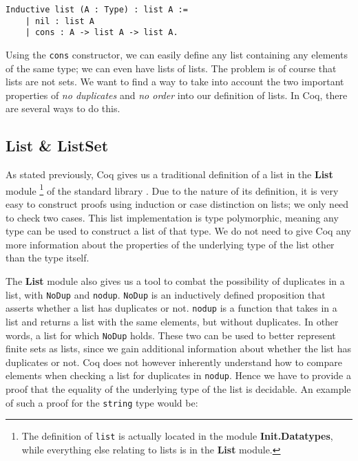 \begin{minipage}{\linewidth}
\begin{lstlisting}[language=Coq, label={lst:list_def}, caption={Inductive definition of list type in Coq}]
Inductive list (A : Type) : list A :=
    | nil : list A
    | cons : A -> list A -> list A.
\end{lstlisting}
\end{minipage}

Using the \lstinline{cons} constructor, we can easily define any list containing any elements of the same type;
we can even have lists of lists.
The problem is of course that lists are not sets. We want to find a way to take into account the two important properties
of \textit{no duplicates} and \textit{no order} into our definition of lists.
In Coq, there are several ways to do this.


\subsection{List \& ListSet}
\label{ssec:list_listset}

As stated previously, Coq gives us a traditional definition of a list in the \textbf{List} module
\footnote{The definition of \lstinline{list} is actually located in the module \textbf{Init.Datatypes}, while everything else relating to lists is in the \textbf{List} module.} of the standard library \cite{coqlist}.
Due to the nature of its definition, it is very easy to construct proofs using induction or case distinction on lists;
we only need to check two cases.
This list implementation is type polymorphic, meaning any type can be used to construct a list of that type.
We do not need to give Coq any more information about the properties of the underlying type of the list other than the type itself.

The \textbf{List} module also gives us a tool to combat the possibility of duplicates in a list,
with \lstinline{NoDup} and \lstinline{nodup}.
\lstinline{NoDup} is an inductively defined proposition that asserts whether a list has duplicates or not.
\lstinline{nodup} is a function that takes in a list and returns a list with the same elements, but without duplicates.
In other words, a list for which \lstinline{NoDup} holds.
These two can be used to better represent finite sets as lists, since
we gain additional information about whether the list has duplicates or not.
Coq does not however inherently understand how to compare elements when checking a list for duplicates in \lstinline{nodup}.
Hence we have to provide a proof that the equality of the underlying type of the list is decidable.
An example of such a proof for the \lstinline{string} type would be:

